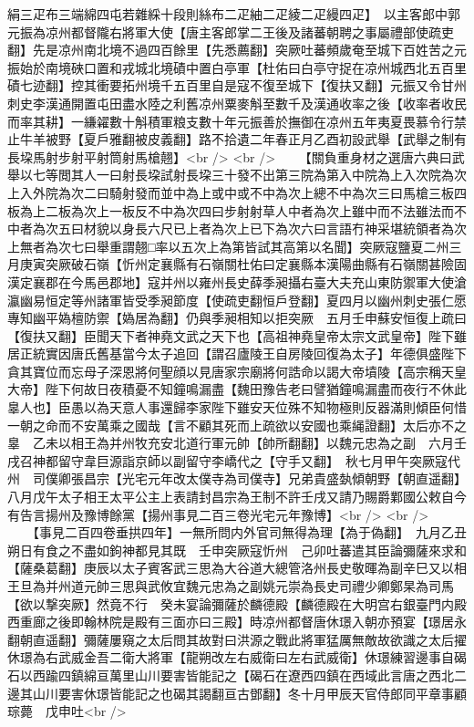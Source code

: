 絹三疋布三端綿四屯若雜綵十段則絲布二疋紬二疋綾二疋縵四疋】　以主客郎中郭元振為凉州都督隴右將軍大使【唐主客郎掌二王後及諸蕃朝聘之事屬禮部使疏吏翻】先是凉州南北境不過四百餘里【先悉薦翻】突厥吐蕃頻歲奄至城下百姓苦之元振始於南境硤口置和戎城北境磧中置白亭軍【杜佑曰白亭守捉在凉州城西北五百里磧七迹翻】控其衝要拓州境千五百里自是寇不復至城下【復扶又翻】元振又令甘州刺史李漢通開置屯田盡水陸之利舊凉州粟麥斛至數千及漢通收率之後【收率者收民而率其耕】一縑糴數十斛積軍粮支數十年元振善於撫御在凉州五年夷夏畏慕令行禁止牛羊被野【夏戶雅翻被皮義翻】路不拾遺二年春正月乙酉初設武舉【武舉之制有長垜馬射步射平射筒射馬槍翹】<br />
<br />
　　【關負重身材之選唐六典曰武舉以七等閲其人一曰射長垜試射長垜三十發不出第三院為第入中院為上入次院為次上入外院為次二曰騎射發而並中為上或中或不中為次上總不中為次三曰馬槍三板四板為上二板為次上一板反不中為次四曰步射射草人中者為次上雖中而不法雖法而不中者為次五曰材貌以身長六尺已上者為次上已下為次六曰言語冇神采堪統領者為次上無者為次七曰舉重謂翹□率以五次上為第皆試其高第以名聞】突厥寇鹽夏二州三月庚寅突厥破石嶺【忻州定襄縣有石嶺關杜佑曰定襄縣本漢陽曲縣有石嶺關甚險固漢定襄郡在今馬邑郡地】寇并州以雍州長史薛季昶攝右臺大夫充山東防禦軍大使滄瀛幽易恒定等州諸軍皆受季昶節度【使疏吏翻恒戶登翻】夏四月以幽州刺史張仁愿專知幽平媯檀防禦【媯居為翻】仍與季昶相知以拒突厥　五月壬申蘇安恒復上疏曰【復扶又翻】臣聞天下者神堯文武之天下也【高祖神堯皇帝太宗文武皇帝】陛下雖居正統實因唐氏舊基當今太子追回【謂召廬陵王自房陵回復為太子】年德俱盛陛下貪其寶位而忘母子深恩將何聖顔以見唐家宗廟將何誥命以謁大帝墳陵【高宗稱天皇大帝】陛下何故日夜積憂不知鐘鳴漏盡【魏田豫告老曰譬猶鐘鳴漏盡而夜行不休此辠人也】臣愚以為天意人事還歸李家陛下雖安天位殊不知物極則反器滿則傾臣何惜一朝之命而不安萬乘之國哉【言不顧其死而上疏欲以安國也乘䋲證翻】太后亦不之辠　乙未以相王為并州牧充安北道行軍元帥【帥所翻翻】以魏元忠為之副　六月壬戌召神都留守韋巨源詣京師以副留守李嶠代之【守手又翻】　秋七月甲午突厥寇代州　司僕卿張昌宗【光宅元年改太僕寺為司僕寺】兄弟貴盛埶傾朝野【朝直遥翻】八月戊午太子相王太平公主上表請封昌宗為王制不許壬戌又請乃賜爵鄴國公敕自今有告言揚州及豫博餘黨【揚州事見二百三卷光宅元年豫博】<br />
<br />
　　【事見二百四卷垂拱四年】一無所問内外官司無得為理【為于偽翻】　九月乙丑朔日有食之不盡如鉤神都見其既　壬申突厥寇忻州　己卯吐蕃遣其臣論彌薩來求和【薩桑葛翻】庚辰以太子賓客武三思為大谷道大總管洛州長史敬暉為副辛巳又以相王旦為并州道元帥三思與武攸宜魏元忠為之副姚元崇為長史司禮少卿鄭杲為司馬【欲以撃突厥】然竟不行　癸未宴論彌薩於麟德殿【麟德殿在大明宫右銀臺門内殿西重廊之後即翰林院是殿有三面亦曰三殿】時凉州都督唐休璟入朝亦預宴【璟居永翻朝直遥翻】彌薩屢窺之太后問其故對曰洪源之戰此將軍猛厲無敵故欲識之太后擢休璟為右武威金吾二衛大將軍【龍朔改左右威衛曰左右武威衛】休璟練習邊事自碣石以西踰四鎮綿亘萬里山川要害皆能記之【碣石在遼西四鎮在西域此言唐之西北二邊其山川要害休璟皆能記之也碣其謁翻亘古鄧翻】冬十月甲辰天官侍郎同平章事顧琮薨　戊申吐<br />
